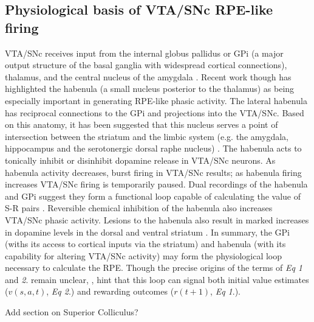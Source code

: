 \documentclass[doc,12pt]{apa}        %
\begin{document}
\subsection{Physiological basis of VTA/SNc RPE-like firing} %
\label{sub:physiological_basis_of_vta_snc_phasic_firing}
VTA/SNc receives input from the internal globus pallidus or GPi (a major output structure of the basal ganglia with widespread cortical connections), thalamus, and the central nucleus of the amygdala \cite{Botvinick:2008p6594}.  Recent work though has highlighted the habenula (a small nucleus posterior to the thalamus) as being especially important in generating RPE-like phasic activity.  The lateral habenula has reciprocal connections to the GPi and projections into the VTA/SNc. Based on this anatomy, it has been suggested that this nucleus serves a point of intersection between the striatum and the limbic system (e.g. the amygdala, hippocampus and the serotonergic dorsal raphe nucleus) \cite{Hikosaka:2008p4455}.  The habenula acts to tonically inhibit or disinhibit dopamine release in VTA/SNc neurons.  As habenula activity decreases, burst firing in VTA/SNc results; as habenula firing increases VTA/SNc firing is temporarily paused.  Dual recordings of the habenula and GPi suggest they form a functional loop capable of calculating the value of S-R pairs \cite{BrombergMartin:2010p7221}.  Reversible chemical inhibition of the habenula also increases VTA/SNc phasic activity.  Lesions to the habenula also result in marked increases in dopamine levels in the dorsal and ventral striatum \cite{BrombergMartin:2010p7221}.  In summary, the GPi (withs its access to cortical inputs via the striatum) and habenula (with its capability for altering VTA/SNc activity) may form the physiological loop necessary to calculate the RPE. Though the precise origins of the terms of \emph{Eq 1} and \emph{2}. remain unclear, , hint that this loop can signal both initial value estimates ($v(s,a,t)$, \emph{Eq 2}.) and rewarding outcomes ($r(t+1)$, \emph{Eq 1}.).

Add section on Superior Colliculus?
\end{document}
